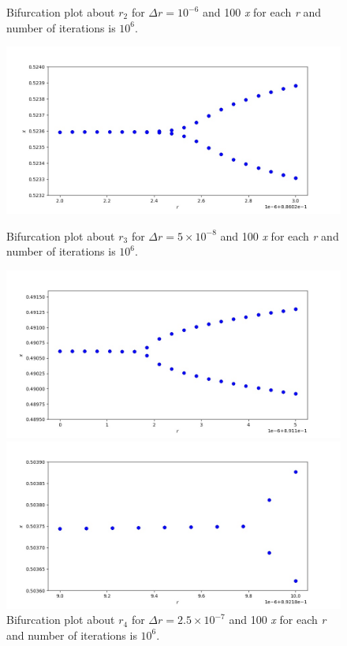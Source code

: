 \documentclass[12pt, a4paper]{article}
\begin{document}
\begin{figure}[h]
\begin{minipage}[b]{0.4\textwidth}
		\caption{Bifurcation plot about $r_2$ for $\Delta r=10^{-6}$ and 100 \textit{x} for each 
				\textit{r} and number of iterations is $10^6$.}
		\label{fig:q4_r2}
		\end{minipage}
		\hfill
		\begin{minipage}[b]{0.4\textwidth}
		\includegraphics[width=\textwidth]{../q4/q4_0.886022_0.886023_20_100_1000000.jpg}
		\caption{Bifurcation plot about $r_3$ for $\Delta r=5\times10^{-8}$ and 100 \textit{x} for each 
		\textit{r} and number of iterations is $10^6$.}
		\label{fig:q4_r3}
		\end{minipage}
		\hfill
		\begin{minipage}[b]{0.4\textwidth}
		\includegraphics[width=\textwidth]{../q4/q4_0.8911_0.891105_20_100_1000000.jpg}
		\caption{Bifurcation plot about $r_4$ for $\Delta r=2.5\times10^{-7}$ and 100 \textit{x} for each 
		\textit{r} and number of iterations is $10^6$.}
		\label{fig:q4_r4}
		\end{minipage}
		\hfill
		\begin{minipage}[b]{0.4\textwidth}
		\includegraphics[width=\textwidth]{../q4/q4_0.892189_0.89219_10_100_1000000.jpg}

\end{minipage}
\end{figure}
\end{document}
